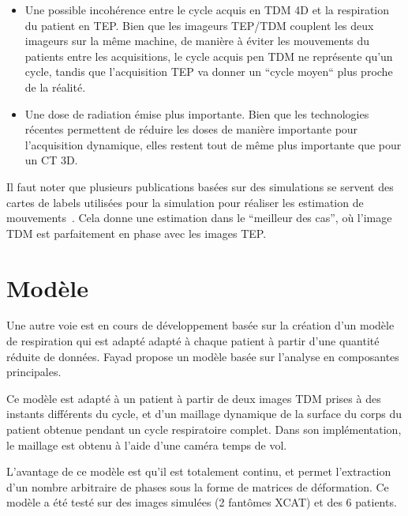 \begin{itemize}
 \item Une possible incohérence entre le cycle acquis en TDM 4D et la respiration du patient en TEP. Bien que les imageurs TEP/TDM couplent les deux imageurs sur la même machine, de manière à éviter les mouvements du patients entre les acquisitions, le cycle acquis pen TDM ne représente qu'un cycle, tandis que l'acquisition TEP va donner un ``cycle moyen`` plus proche de la réalité.
 \item Une dose de radiation émise plus importante. Bien que les technologies récentes permettent de réduire les doses de manière importante pour l'acquisition dynamique, elles restent tout de même plus importante que pour un CT 3D.
\end{itemize}

Il faut noter que plusieurs publications basées sur des simulations se servent des cartes de labels utilisées pour la simulation pour réaliser les estimation de mouvements~\cite{lamare2007list}. Cela donne une estimation dans le ``meilleur des cas'', où l'image TDM est parfaitement en phase avec les images TEP.



\section{Modèle}

Une autre voie est en cours de développement basée sur la création d'un modèle de respiration qui est adapté adapté à chaque patient à partir d'une quantité réduite de données. Fayad \cite{fayad2010application} propose un modèle basée sur l'analyse en composantes principales. 

Ce modèle est adapté à un patient à partir de deux images TDM prises à des instants différents du cycle, et d'un maillage dynamique de la surface du corps du patient obtenue pendant un cycle respiratoire complet. Dans son implémentation, le maillage est obtenu à l'aide d'une caméra temps de vol.

L'avantage de ce modèle est qu'il est totalement continu, et permet l'extraction d'un nombre arbitraire de phases sous la forme de matrices de déformation. Ce modèle a été testé sur des images simulées (2 fantômes XCAT) et des 6 patients.